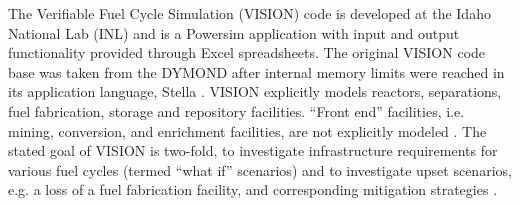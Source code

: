 The Verifiable Fuel Cycle Simulation (VISION) code is developed at the Idaho
National Lab (INL) and is a Powersim \cite{studio_powersim_2003} application
with input and output functionality provided through Excel spreadsheets. The
original VISION code base was taken from the DYMOND
\cite{moisseytsev_dymond_2001} after internal memory limits were reached in its
application language, Stella \cite{clauset_stella_1987}. VISION explicitly
models reactors, separations, fuel fabrication, storage and repository
facilities. ``Front end'' facilities, i.e. mining, conversion, and enrichment
facilities, are not explicitly modeled \cite{guerin_benchmark_2009}. The stated
goal of VISION is two-fold, to investigate infrastructure requirements for
various fuel cycles (termed ``what if'' scenarios)
\cite{jacobson_verifiable_2010} and to investigate upset scenarios, e.g. a loss
of a fuel fabrication facility, and corresponding mitigation strategies
\cite{schweitzer_improved_2008}.
